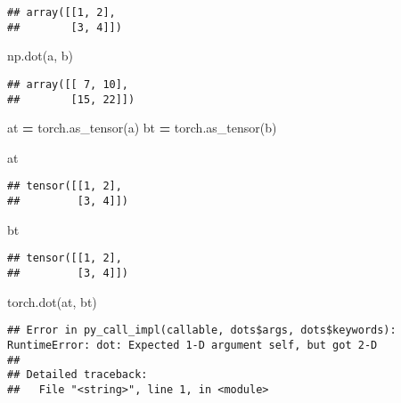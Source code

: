 \documentclass[]{book}
\newenvironment{Shaded}{\begin{snugshade}}{\end{snugshade}}
\newcommand{\NormalTok}[1]{#1}
\newcommand{\OperatorTok}[1]{\textcolor[rgb]{0.81,0.36,0.00}{\textbf{#1}}}
\begin{document}
\begin{verbatim}
## array([[1, 2],
##        [3, 4]])
\end{verbatim}

\begin{Shaded}
\begin{Highlighting}[]
\NormalTok{np.dot(a, b)}
\end{Highlighting}
\end{Shaded}

\begin{verbatim}
## array([[ 7, 10],
##        [15, 22]])
\end{verbatim}

\begin{Shaded}
\begin{Highlighting}[]
\NormalTok{at }\OperatorTok{=}\NormalTok{ torch.as_tensor(a)}
\NormalTok{bt }\OperatorTok{=}\NormalTok{ torch.as_tensor(b)}

\NormalTok{at}
\end{Highlighting}
\end{Shaded}

\begin{verbatim}
## tensor([[1, 2],
##         [3, 4]])
\end{verbatim}

\begin{Shaded}
\begin{Highlighting}[]
\NormalTok{bt}
\end{Highlighting}
\end{Shaded}

\begin{verbatim}
## tensor([[1, 2],
##         [3, 4]])
\end{verbatim}

\begin{Shaded}
\begin{Highlighting}[]
\NormalTok{torch.dot(at, bt)}
\end{Highlighting}
\end{Shaded}

\begin{verbatim}
## Error in py_call_impl(callable, dots$args, dots$keywords): RuntimeError: dot: Expected 1-D argument self, but got 2-D
## 
## Detailed traceback: 
##   File "<string>", line 1, in <module>
\end{verbatim}
\end{document}
